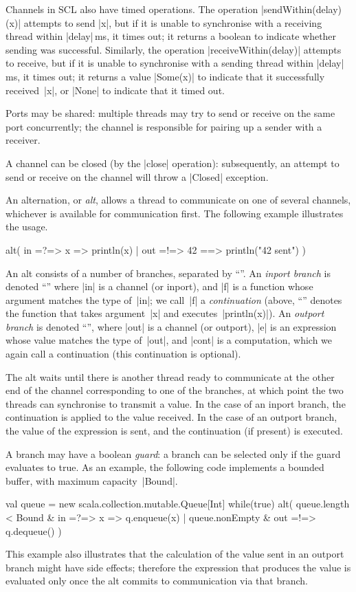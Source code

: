 Channels in SCL also have timed operations.  The operation
|sendWithin(delay)(x)| attempts to send |x|, but if it is unable to
synchronise with a receiving thread within |delay|\,ms, it times out; it
returns a boolean to indicate whether sending was successful.  Similarly, the
operation |receiveWithin(delay)| attempts to receive, but if it is unable to
synchronise with a sending thread within |delay|\,ms, it times out; it returns
a value |Some(x)| to indicate that it successfully received~|x|, or |None| to
indicate that it timed out.

Ports may be shared: multiple threads may try to send or receive on the same
port concurrently; the channel is responsible for pairing up a sender with a
receiver. 

A channel can be closed (by the |close| operation): subsequently, an attempt
to send or receive on the channel will throw a |Closed| exception.

An alternation, or \emph{alt}, allows a thread to communicate on one of
several channels, whichever is available for communication first.  The
following example illustrates the usage.
%
\begin{scala}
alt(
  in =?=> { x => println(x) }
  | out =!=> { 42 } ==> { println("42 sent") }
)
\end{scala}
%
An alt consists of a number of branches, separated by ``\SCALA{\|}''.  An
\emph{inport branch} is denoted ``'' where |in| is a channel
(or inport), and |f| is a function whose argument matches the type of~|in|; we
call~|f| a \emph{continuation} (above, ``'' denotes the
function that takes argument~|x| and executes~|println(x)|).  An \emph{outport
  branch} is denoted ``'', where |out| is a channel
(or outport), |e| is an expression whose value matches the type of~|out|, and
|cont| is a computation, which we again call a continuation (this continuation is
optional).  

The alt waits until there is another thread ready to communicate at the other
end of the channel corresponding to one of the branches, at which point the
two threads can synchronise to transmit a value.  In the case of an inport
branch, the continuation is applied to the value received.  In the case of an
outport branch, the value of the expression is sent, and the continuation (if
present) is executed.

A branch may have a boolean \emph{guard}: a branch can be selected only if the
guard evaluates to true.  As an example, the following code implements a
bounded buffer, with maximum capacity~|Bound|.
%
\begin{scala}
val queue = new scala.collection.mutable.Queue[Int]
while(true){
  alt(
    queue.length < Bound & in =?=> { x => q.enqueue(x) }
    | queue.nonEmpty & out =!=> { q.dequeue() }
  )    
}
\end{scala}
%
This example also illustrates that the calculation of the value sent in an
outport branch might have side effects; therefore the expression that produces
the value is evaluated only once the alt commits to communication via that
branch.

